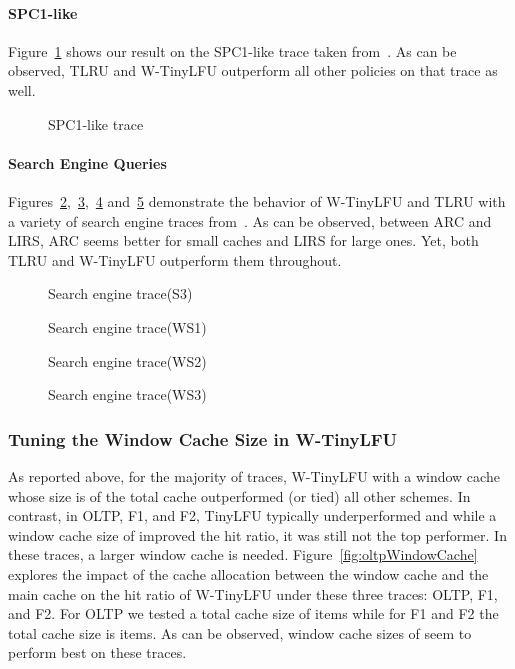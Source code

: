 \documentclass[10pt,a4paper]{article}
\begin{document}
\paragraph*{SPC1-like}
Figure~\ref{fig:SPClike} shows our result on the SPC1-like trace taken from~\cite{ARC}.
As can be observed, TLRU and W-TinyLFU outperform all other policies on that trace as well.
\begin{figure}[t]
	\caption{SPC1-like trace}
	\label{fig:SPClike}
\end{figure}

\paragraph*{Search Engine Queries}
Figures~\ref{fig:search},~\ref{fig:search1},~\ref{fig:search2} and~\ref{fig:search3} demonstrate the behavior of W-TinyLFU and TLRU with a variety of search engine traces from~\cite{ARC,UMAS}.
As can be observed, between ARC and LIRS, ARC seems better for small caches and LIRS for large ones.
Yet, both TLRU and W-TinyLFU outperform them throughout.

\begin{figure}[t]
	\caption{Search engine trace(S3)}
	\label{fig:search}
\end{figure}
\begin{figure}[t]
	\caption{Search engine trace(WS1)}
	\label{fig:search1}
\end{figure}
\begin{figure}[t]
	\caption{Search engine trace(WS2)}
	\label{fig:search2}
\end{figure}
\begin{figure}[t]
	\caption{Search engine trace(WS3)}
	\label{fig:search3}
\end{figure}

\subsubsection{Tuning the Window Cache Size in W-TinyLFU}
\label{sec:window-tuning}

As reported above, for the majority of traces, W-TinyLFU with a window cache whose size is  of the total cache outperformed (or tied) all other schemes.
In contrast, in OLTP, F1, and F2, TinyLFU typically underperformed and while a window cache size of  improved the hit ratio, it was still not the top performer.
In these traces, a larger window cache is needed.
Figure~\ref{fig:oltpWindowCache} explores the impact of the cache allocation between the window cache and the main cache on the hit ratio of W-TinyLFU under these three traces: OLTP, F1, and F2.
For OLTP we tested a total cache size of  items while for F1 and F2 the total cache size is  items.
As can be observed, window cache sizes of  seem to perform best on these traces.
\end{document}
